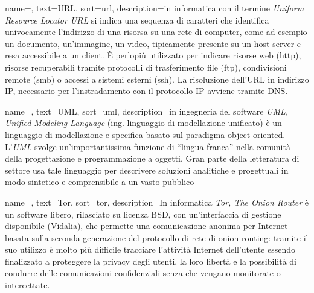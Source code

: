 
\renewcommand{\acronymname}{Acronimi e abbreviazioni}




{
    name=,
    text=URL,
    sort=url,
    description={in informatica con il termine \emph{Uniform Resource Locator URL} si indica una sequenza di caratteri che identifica univocamente l'indirizzo di una risorsa su una rete di computer, come ad esempio un documento, un'immagine, un video, tipicamente presente su un host server e resa accessibile a un client. È perlopiù utilizzato per indicare risorse web (http), risorse recuperabili tramite protocolli di trasferimento file (ftp), condivisioni remote (smb) o accessi a sistemi esterni (ssh). La risoluzione dell'URL in indirizzo IP, necessario per l'instradamento con il protocollo IP avviene tramite DNS. }
}

{
    name=,
    text=UML,
    sort=uml,
    description={in ingegneria del software \emph{UML, Unified Modeling Language} (ing. linguaggio di modellazione unificato) è un linguaggio di modellazione e specifica basato sul paradigma object-oriented. L'\emph{UML} svolge un'importantissima funzione di ``lingua franca'' nella comunità della progettazione e programmazione a oggetti. Gran parte della letteratura di settore usa tale linguaggio per descrivere soluzioni analitiche e progettuali in modo sintetico e comprensibile a un vasto pubblico}
}

{
    name=,
    text=Tor,
    sort=tor,
    description={In informatica \emph{Tor, The Onion Router} è un software libero, rilasciato su licenza BSD, con un'interfaccia di gestione disponibile (Vidalia), che permette una comunicazione anonima per Internet basata sulla seconda generazione del protocollo di rete di onion routing: tramite il suo utilizzo è molto più difficile tracciare l'attività Internet dell'utente essendo finalizzato a proteggere la privacy degli utenti, la loro libertà e la possibilità di condurre delle comunicazioni confidenziali senza che vengano monitorate o intercettate.}
}

